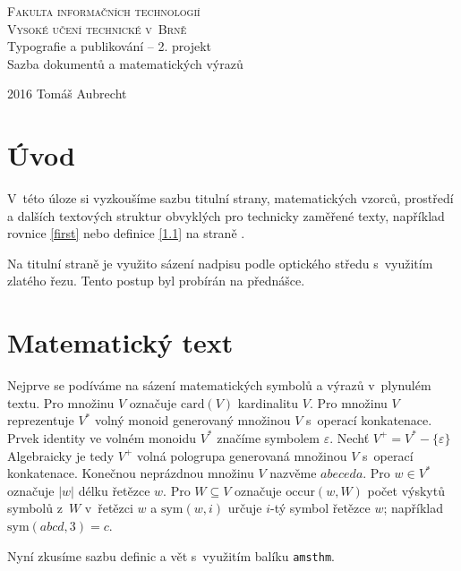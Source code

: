\documentclass[a4paper, 11pt, twocolumn]{article}
\theoremstyle{definition}
\theoremstyle{plain}
\theoremstyle{plain}
\begin{document}
	\begin{titlepage}

		\begin{center}
			{\Huge
			\textsc{Fakulta informačních technologií\\
					Vysoké učení technické v~Brně}}\\
			\LARGE
			Typografie a publikování -- 2. projekt\\
			Sazba dokumentů a matematických výrazů\\
		\end{center}
		{\Large 2016 \hfill Tomáš Aubrecht}

		\pagestyle{plain}

	\end{titlepage}

\newpage

	\section*{Úvod}
	V~této úloze si vyzkoušíme sazbu titulní strany, matematických vzorců, prostředí a dalších textových struktur obvyklých pro technicky zaměřené texty, například rovnice \eqref{first} nebo definice \ref{1.1}	na straně \pageref{1.1}.

	Na titulní straně je využito sázení nadpisu podle optického středu s~využitím zlatého řezu. Tento postup byl probírán na přednášce.


	\section{Matematický text}
	Nejprve se podíváme na sázení matematických symbolů a výrazů v~plynulém textu. Pro množinu $V$ označuje $\text{card}(V)$ kardinalitu $V$.
	Pro množinu $V$ reprezentuje $V^*$ volný monoid generovaný množinou $V$ s~operací konkatenace.
	Prvek identity ve volném monoidu $V^*$ značíme symbolem $\varepsilon$.
	Nechť $V^+ =V^* - \{\varepsilon\}$ Algebraicky je tedy $V^+$ volná pologrupa generovaná množinou $V$ s~operací konkatenace.
	Konečnou neprázdnou množinu $V$ nazvěme $abeceda$.
	Pro $w \in V^*$ označuje $|w|$ délku řetězce $w$. Pro $W \subseteq V$ označuje $\text{occur}(w,W)$ počet výskytů symbolů z~$W$ v~řetězci $w$ a $\text{sym}(w,i)$ určuje $i$-tý symbol řetězce $w$;  například $\text{sym}(abcd,3)=c$.

	Nyní zkusíme sazbu definic a vět s~využitím balíku \texttt{amsthm}.
\end{document}
